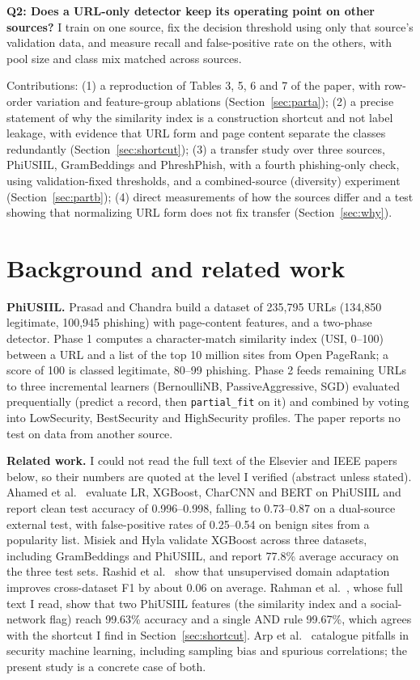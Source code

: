 \documentclass[10pt]{article}
\begin{document}
\textbf{Q2: Does a URL-only detector keep its operating point on other sources?} I train on one source, fix the decision threshold using only that source's validation data, and measure recall and false-positive rate on the others, with pool size and class mix matched across sources.

Contributions:
(1) a reproduction of Tables 3, 5, 6 and 7 of the paper, with row-order variation and feature-group ablations (Section~\ref{sec:parta});
(2) a precise statement of why the similarity index is a construction shortcut and not label leakage, with evidence that URL form and page content separate the classes redundantly (Section~\ref{sec:shortcut});
(3) a transfer study over three sources, PhiUSIIL, GramBeddings and PhreshPhish, with a fourth phishing-only check, using validation-fixed thresholds, and a combined-source (diversity) experiment (Section~\ref{sec:partb});
(4) direct measurements of how the sources differ and a test showing that normalizing URL form does not fix transfer (Section~\ref{sec:why}).

\section{Background and related work}
\textbf{PhiUSIIL.} Prasad and Chandra \cite{prasad2024} build a dataset of 235,795 URLs (134,850 legitimate, 100,945 phishing) with page-content features, and a two-phase detector. Phase 1 computes a character-match similarity index (USI, 0--100) between a URL and a list of the top 10 million sites from Open PageRank; a score of 100 is classed legitimate, 80--99 phishing. Phase 2 feeds remaining URLs to three incremental learners (BernoulliNB, PassiveAggressive, SGD) evaluated prequentially (predict a record, then \texttt{partial\_fit} on it) and combined by voting into LowSecurity, BestSecurity and HighSecurity profiles. The paper reports no test on data from another source.

\textbf{Related work.} I could not read the full text of the Elsevier and IEEE papers below, so their numbers are quoted at the level I verified (abstract unless stated). Ahamed et al.\ \cite{ahamed2026} evaluate LR, XGBoost, CharCNN and BERT on PhiUSIIL and report clean test accuracy of 0.996--0.998, falling to 0.73--0.87 on a dual-source external test, with false-positive rates of 0.25--0.54 on benign sites from a popularity list. Misiek and Hyla \cite{misiek2026} validate XGBoost across three datasets, including GramBeddings and PhiUSIIL, and report 77.8\% average accuracy on the three test sets. Rashid et al.\ \cite{rashid2024} show that unsupervised domain adaptation improves cross-dataset F1 by about 0.06 on average. Rahman et al.\ \cite{rahman2026}, whose full text I read, show that two PhiUSIIL features (the similarity index and a social-network flag) reach 99.63\% accuracy and a single AND rule 99.67\%, which agrees with the shortcut I find in Section~\ref{sec:shortcut}. Arp et al.\ \cite{arp2022} catalogue pitfalls in security machine learning, including sampling bias and spurious correlations; the present study is a concrete case of both.
\end{document}
